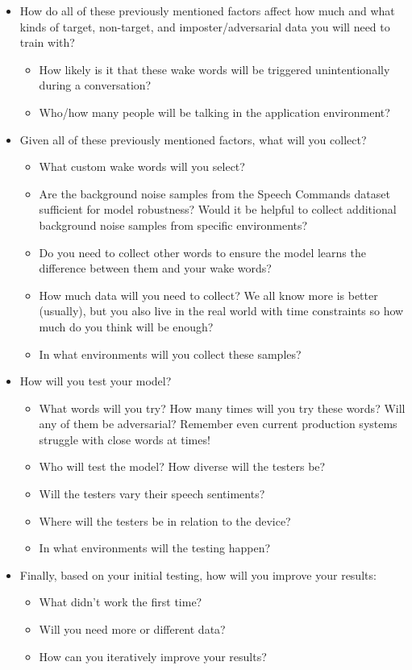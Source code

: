 \begin{itemize}
\begin{itemize}
      \item Will different users have different sentiments?
    \end{itemize}    
  \item   How do all of these previously mentioned factors affect how much and what kinds of target, non-target, and imposter/adversarial data you will need to train with?
    \begin{itemize}
      \item How likely is it that these wake words will be triggered unintentionally during a conversation?
      \item Who/how many people will be talking in the application environment?
    \end{itemize}    
  \item   Given all of these previously mentioned factors, what will you collect?
    \begin{itemize}
      \item What custom wake words will you select?
      \item Are the background noise samples from the Speech Commands dataset sufficient for model robustness? Would it be helpful to collect additional background noise samples from specific environments?
      \item Do you need to collect other words to ensure the model learns the difference between them and your wake words?
      \item How much data will you need to collect? We all know more is better (usually), but you also live in the real world with time constraints so how much do you think will be enough?
      \item In what environments will you collect these samples?
    \end{itemize}    
  \item   How will you test your model?
    \begin{itemize}
      \item What words will you try? How many times will you try these words? Will any of them be adversarial? Remember even current production systems struggle with close words at times!
      \item Who will test the model? How diverse will the testers be?
      \item Will the testers vary their speech sentiments?
      \item Where will the testers be in relation to the device?
      \item In what environments will the testing happen?
    \end{itemize}    
  \item Finally, based on your initial testing, how will you improve your results:
    \begin{itemize}
      \item What didn't work the first time?
      \item Will you need more or different data?
      \item How can you iteratively improve your results?
    \end{itemize}    
\end{itemize}    
         
